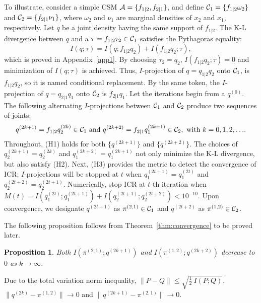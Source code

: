 \documentclass[12pt,a4paper]{article}
\newtheorem{proposition}[definition]{Proposition}
\begin{document}
To illustrate, consider a simple CSM ${\cal A}=\{f_{1|2},f_{2|1}\}$, and
define ${\cal C}_1=\{f_{1|2}\omega_2\}$ and ${\cal C}_2=\{f_{2|1}\nu_1\}$,
where $\omega_2$ and $\nu_1$ are  marginal densities of $x_2$ and $x_1$,
respectively. Let $q$ be a joint density having the same support of $f_{1|2}$.
The K-L divergence between $q$ and a $\tau= f_{1|2} \tau_2 \in {\cal C}_1$ satisfies the Pythagoras equality:
\[I(q;\tau)=I(q; f_{1|2}q_2) + I(f_{1|2}q_2;\tau),\]
which is proved in Appendix~\ref{app1}.
By choosing $\tau_2=q_2$, $I(f_{1|2}q_2;\tau)=0$ and minimization of $I(q;\tau)$ is achieved.  Thus, $I$-projection of $q=q_{1|2} q_2$ onto ${\cal C}_1$, is $f_{1|2} q_2$, so it is named conditional replacement.
By the same token, the $I$-projection of $q=q_{2|1} q_1$ onto ${\cal C}_2$ is $f_{2|1}q_1$.
Let the iterations begin from a $q^{(0)} $.
The following  alternating $I$-projections between $ {\cal C}_1$ and $ {\cal C}_2$ produce  two sequences of joints:
\[
q^{(2k+1)}=f_{1|2}q^{(2k)}_2 \in {\cal C}_1 \mbox{ and } q^{(2k+2)}=f_{2|1} q^{(2k+1)}_1 \in {\cal C}_2, \mbox{ with $k=0,1,2,\ldots$.}
\]
Throughout, (H1) holds for both $\{ q^{(2k+1)} \}$ and $\{ q^{(2k+2)} \}$.
The choices of $q^{(2k+1)}_2= q^{(2k)}_2$ and  $q^{(2k+2)}_1= q^{(2k+1)}_1$ not only  minimize the K-L divergence, but also satisfy (H2).
Next, (H3) provides the metric to detect the convergence of ICR;
$I$-projections will be stopped at $t$ when $q^{(2t+1)}_1=q^{(2t)}_1$ and $q^{(2t+2)}_2=q^{(2t+1)}_2$.
Numerically, stop ICR at $t$-th iteration when $M(t)=I(q_1^{(2t)};q_1^{(2t+1)})+I(q_2^{(2t+1)};q_2^{(2t+2)}) < 10^{-10}$.
Upon convergence, we designate $q^{(2t+1)}$ as $\pi^{(2,1)} \in {\cal C}_1$ and $q^{(2t+2)} $ as $\pi^{(1,2)} \in {\cal C}_2$.  %

The following proposition follows from Theorem~\ref{thm:convergence} to be proved later.
\begin{proposition}
Both $I(\pi^{(2,1)}; q^{(2k+1)})$  and $I(\pi^{(1,2)};q^{(2k+2)})$ decrease
to $0$ as $k\to \infty$.
\end{proposition}
Due to the total variation norm inequality, $\|P-Q\| \leq \sqrt{\frac{1}{2}~I(P;Q)} $,
$\|q^{(2k)} - \pi^{(1,2)}\| \rightarrow 0$ and $\|q^{(2k+1)} - \pi^{(2,1)}\| \rightarrow 0$.
\end{document}
